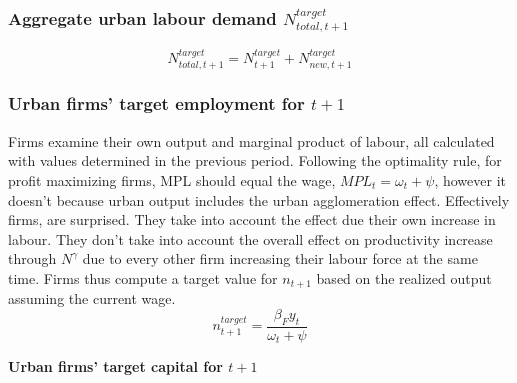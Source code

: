 \subsubsection{Aggregate urban labour demand $N_{total,t+1}^{target}$} 
\[N_{total,t+1}^{target}= N_{t+1}^{target}+N_{new, t+1}^{target} \]


\subsubsection{Urban firms' target employment for $t+1$} Firms examine their own output and marginal product of labour, all calculated with values determined in the previous period. 
Following the  optimality rule, for profit maximizing firms, MPL should equal the wage, $MPL_t= {\omega_t + \psi}$, however it doesn't because urban output includes the urban agglomeration effect. Effectively firms, are surprised. They take into account the effect due their own increase in labour. They don't take into account the overall effect on  productivity increase  through $N^\gamma$ due to every other firm increasing their labour force at the same time.
Firms thus compute a target value for $n_{t+1}$ based on the realized output  assuming the current wage. %
\begin{equation} n^{target}_{t+1}= \frac{\beta_F {y}_{t}}{\omega_t + \psi} \label{eqn-urban-firm-target}
\end{equation}




\textbf{Urban firms' target capital for $t+1$} 

